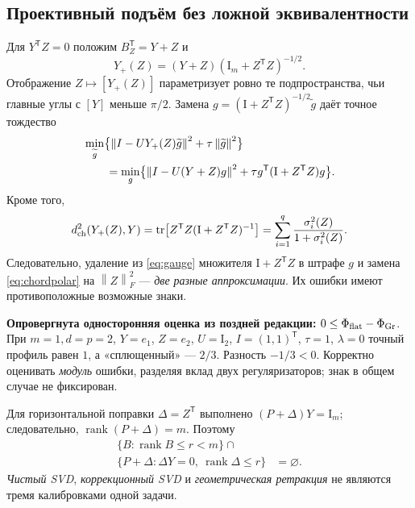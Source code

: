 \documentclass[10.5pt,a4paper]{article}
\newcommand{\I}{\mathrm{I}}
\newcommand{\T}{^{\mathsf T}}
\newcommand{\norm}[1]{\left\|#1\right\|}
\DeclareMathOperator{\tr}{tr}
\DeclareMathOperator{\rank}{rank}
\numberwithin{equation}{section}
\theoremstyle{plain}
\theoremstyle{definition}
\begin{document}
\subsection{Проективный подъём без ложной эквивалентности}
Для $Y\T Z=0$ положим $B_Z\T=Y+Z$ и
\begin{equation}
 Y_+(Z)=(Y+Z)(\I_m+Z\T Z)^{-1/2}.
 \label{eq:polar}
\end{equation}
Отображение $Z\mapsto[Y_+(Z)]$ параметризует ровно те подпространства, чьи главные углы с $[Y]$ меньше $\pi/2$. Замена $g=(\I+Z\T Z)^{-1/2}\widetilde g$ даёт точное тождество
\begin{align}
 &\min_{\widetilde g}\bigl\{\norm{I-UY_+(Z)\widetilde g}^2+\tau\norm{\widetilde g}^2\bigr\}\notag\\
 &\qquad=\min_{g}\bigl\{\norm{I-U(Y+Z)g}^2+\tau g\T(\I+Z\T Z)g\bigr\}.
 \label{eq:gauge}
\end{align}
Кроме того,
\begin{equation}
 d_{\rm ch}^2(Y_+(Z),Y)=\tr\bigl[Z\T Z(\I+Z\T Z)^{-1}\bigr]
 =\sum_{i=1}^q\frac{\sigma_i^2(Z)}{1+\sigma_i^2(Z)}.
 \label{eq:chordpolar}
\end{equation}
Следовательно, удаление из \eqref{eq:gauge} множителя $\I+Z\T Z$ в штрафе $g$ и замена \eqref{eq:chordpolar} на $\norm{Z}_F^2$ --- \emph{две разные аппроксимации}. Их ошибки имеют противоположные возможные знаки.

\begin{auditbox}
\textbf{Опровергнута односторонняя оценка из поздней редакции:}
$0\le \Phi_{\rm flat}-\Phi_{\rm Gr}$. При $m=1,d=p=2$, $Y=e_1$, $Z=e_2$, $U=\I_2$, $I=(1,1)\T$, $\tau=1$, $\lambda=0$ точный профиль равен $1$, а «сплющенный» --- $2/3$. Разность $-1/3<0$. Корректно оценивать \emph{модуль} ошибки, разделяя вклад двух регуляризаторов; знак в общем случае не фиксирован.
\end{auditbox}

Для горизонтальной поправки $\Delta=Z\T$ выполнено $(P+\Delta)Y=\I_m$; следовательно, $\rank(P+\Delta)=m$. Поэтому
\begin{equation}
 \begin{aligned}\{B:\rank B\le r<m\}\cap\\
 \{P+\Delta:\Delta Y=0,\ \rank\Delta\le r\}&=\varnothing.\end{aligned}
 \label{eq:disjoint}
\end{equation}
\emph{Чистый SVD}, \emph{коррекционный SVD} и \emph{геометрическая ретракция} не являются тремя калибровками одной задачи.
\end{document}
